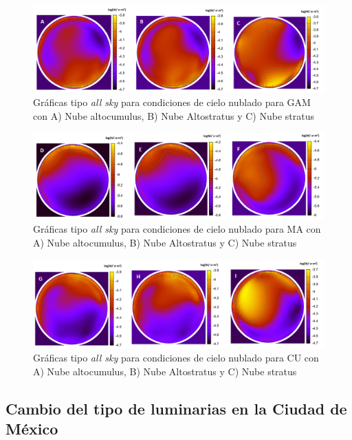 \begin{figure}[H]
  \centering
    \includegraphics[width=1\textwidth]{5}
  \caption{Gráficas tipo \textit{all sky} para condiciones de cielo nublado para GAM con A) Nube altocumulus, B) Nube Altostratus y C) Nube stratus} 
  \label{5}
\end{figure}

\begin{figure}[H]
  \centering
    \includegraphics[width=1\textwidth]{6}
  \caption{Gráficas tipo \textit{all sky} para condiciones de cielo nublado para MA con A) Nube altocumulus, B) Nube Altostratus y C) Nube stratus} 
  \label{6}
\end{figure}

\begin{figure}[H]
  \centering
    \includegraphics[width=1\textwidth]{7}
  \caption{Gráficas tipo \textit{all sky} para condiciones de cielo nublado para CU con A) Nube altocumulus, B) Nube Altostratus y C) Nube stratus} 
  \label{7}
\end{figure}

\newpage

\subsection{Cambio del tipo de luminarias en la Ciudad de México}

